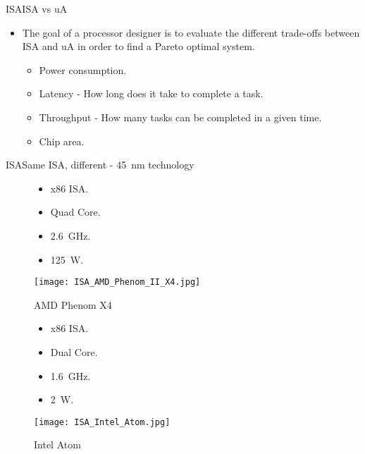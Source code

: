 \documentclass[]{slides}
\begin{document}
\begin{frame}{\acl{ISA}}{\acs{ISA} vs \acs{uA}}
\begin{itemize}
  \item The goal of a processor designer is to evaluate the different trade-offs between \ac{ISA} and \ac{uA} in order to find a Pareto optimal system.
  \begin{itemize}
    \item Power consumption.
	\item Latency - How long does it take to complete a task.
	\item Throughput - How many tasks can be completed in a given time.
	\item Chip area.
  \end{itemize}	 
\end{itemize}
\end{frame}

\begin{frame}{\acl{ISA}}{Same \ac{ISA}, different \uA - 45~nm technology}
\begin{figure}[!htb]
  \begin{minipage}{0.5\textwidth}
    \centering
    \begin{itemize}
      \item x86 \ac{ISA}.
      \item Quad Core.
      \item 2.6~GHz.
      \item 125~W.
    \end{itemize}
    \texttt{[image: ISA\_AMD\_Phenom\_II\_X4.jpg]}
    \caption{AMD Phenom X4}
    \label{Figure:AMD_Phenom_X4a}
  \end{minipage}%
  \begin{minipage}{0.50\textwidth}
    \centering
    \begin{itemize}
      \item x86 \ac{ISA}.
      \item Dual Core.
      \item 1.6~GHz.
      \item 2~W.
    \end{itemize}
    \vspace{14mm}
    \texttt{[image: ISA\_Intel\_Atom.jpg]}
    \caption{Intel Atom}
    \label{Figure:Intel_Atom}
  \end{minipage}
\end{figure}
\end{frame}
\end{document}
